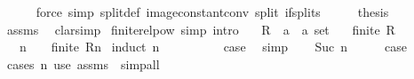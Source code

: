 \begin{isabellebody}
\ \ \ \ \isamarkupfalse%
\ {\isacharparenleft}{\kern0pt}force\ simp{\isacharcolon}{\kern0pt}\ split{\isacharunderscore}{\kern0pt}def\ image{\isacharunderscore}{\kern0pt}constant{\isacharunderscore}{\kern0pt}conv\ split{\isacharcolon}{\kern0pt}\ if{\isacharunderscore}{\kern0pt}splits{\isacharparenright}{\kern0pt}\isanewline
\ \ \isamarkupfalse%
\ \isamarkupfalse%
\ {\isacharquery}{\kern0pt}thesis\isanewline
\ \ \ \ \isamarkupfalse%
\ assms\ \isamarkupfalse%
\ clarsimp\isanewline
{}\isamarkupfalse%
%
\endisatagproof
{\isafoldproof}%
%
\isadelimproof
\isanewline
%
\endisadelimproof
\isanewline
{}\isamarkupfalse%
\ finite{\isacharunderscore}{\kern0pt}relpow\ {\isacharbrackleft}{\kern0pt}simp{\isacharcomma}{\kern0pt}\ intro{\isacharbrackright}{\kern0pt}{\isacharcolon}{\kern0pt}\isanewline
\ \ \ R\ {\isacharcolon}{\kern0pt}{\isacharcolon}{\kern0pt}\ {\isachardoublequoteopen}{\isacharparenleft}{\kern0pt}{\isacharprime}{\kern0pt}a\ {\isasymtimes}\ {\isacharprime}{\kern0pt}a{\isacharparenright}{\kern0pt}\ set{\isachardoublequoteclose}\isanewline
\ \ \ {\isachardoublequoteopen}finite\ R{\isachardoublequoteclose}\isanewline
\ \ \ {\isachardoublequoteopen}n\ {\isachargreater}{\kern0pt}\ {}\ {\isasymLongrightarrow}\ finite\ {\isacharparenleft}{\kern0pt}R{\isacharcircum}{\kern0pt}{\isacharcircum}{\kern0pt}n{\isacharparenright}{\kern0pt}{\isachardoublequoteclose}\isanewline
%
\isadelimproof
%
\endisadelimproof
%
\isatagproof
{}\isamarkupfalse%
\ {\isacharparenleft}{\kern0pt}induct\ n{\isacharparenright}{\kern0pt}\isanewline
\ \ \isamarkupfalse%
\ {}\isanewline
\ \ \isamarkupfalse%
\ \isamarkupfalse%
\ {\isacharquery}{\kern0pt}case\ \isamarkupfalse%
\ simp\isanewline
{}\isamarkupfalse%
\isanewline
\ \ \isamarkupfalse%
\ {\isacharparenleft}{\kern0pt}Suc\ n{\isacharparenright}{\kern0pt}\isanewline
\ \ \isamarkupfalse%
\ \isamarkupfalse%
\ {\isacharquery}{\kern0pt}case\ \isamarkupfalse%
\ {\isacharparenleft}{\kern0pt}cases\ n{\isacharparenright}{\kern0pt}\ {\isacharparenleft}{\kern0pt}use\ assms\ \ simp{\isacharunderscore}{\kern0pt}all{\isacharparenright}{\kern0pt}\isanewline
{}\isamarkupfalse%
%
\endisatagproof
{\isafoldproof}%
%
\isadelimproof
\isanewline
%
\endisadelimproof
\isanewline
{}\isamarkupfalse%

\end{isabellebody}
